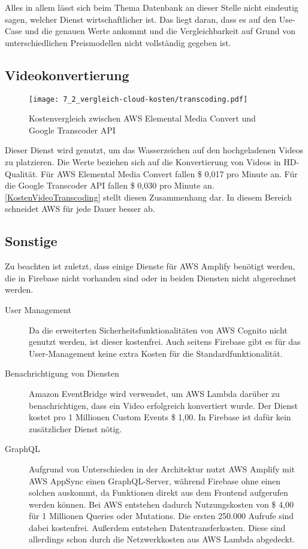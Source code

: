 Alles in allem lässt sich beim Thema Datenbank an dieser Stelle nicht eindeutig sagen, welcher Dienst wirtschaftlicher ist. Das liegt daran, dass es auf den Use-Case und die genauen Werte ankommt und die Vergleichbarkeit auf Grund von unterschiedlichen Preismodellen nicht vollständig gegeben ist.

\subsection{Videokonvertierung}

\begin{figure}
  \centering
  \texttt{[image: 7\_2\_vergleich-cloud-kosten/transcoding.pdf]}
  \caption{Kostenvergleich zwischen AWS Elemental Media Convert und Google Transcoder API}
  \label{KostenVideoTranscoding}
\end{figure}

Dieser Dienst wird genutzt, um das Wasserzeichen auf den hochgeladenen Videos zu platzieren. Die Werte beziehen sich auf die Konvertierung von Videos in HD-Qualität. Für \ac{AWS} Elemental Media Convert fallen \$ 0,017 pro Minute an. Für die Google Transcoder API fallen \$ 0,030 pro Minute an. \autoref{KostenVideoTranscoding} stellt diesen Zusammenhang dar. In diesem Bereich schneidet \ac{AWS} für jede Dauer besser ab.

\subsection{Sonstige}

Zu beachten ist zuletzt, dass einige Dienste für \ac{AWS} Amplify benötigt werden, die in Firebase nicht vorhanden sind oder in beiden Diensten nicht abgerechnet werden.
\begin{description}
\item[User Management] Da die erweiterten Sicherheitsfunktionalitäten von \ac{AWS} Cognito nicht genutzt werden, ist dieser kostenfrei. Auch seitens Firebase gibt es für das User-Management keine extra Kosten für die Standardfunktionalität.
\item[Benachrichtigung von Diensten] Amazon EventBridge wird verwendet, um \ac{AWS} Lambda darüber zu benachrichtigen, dass ein Video erfolgreich konvertiert wurde. Der Dienst kostet pro 1 Millionen Custom Events \$ 1,00. In Firebase ist dafür kein zusätzlicher Dienst nötig.
\item[GraphQL] Aufgrund von Unterschieden in der Architektur nutzt \ac{AWS} Amplify mit AWS AppSync einen GraphQL-Server, während Firebase ohne einen solchen auskommt, da Funktionen direkt aus dem Frontend aufgerufen werden können. Bei \ac{AWS} entstehen dadurch Nutzungskosten von \$ 4,00 für 1 Millionen Queries oder Mutations. Die ersten 250.000 Aufrufe sind dabei kostenfrei. Außerdem entstehen Datentransferkosten. Diese sind allerdings schon durch die Netzwerkkosten aus \ac{AWS} Lambda abgedeckt.
\end{description}

